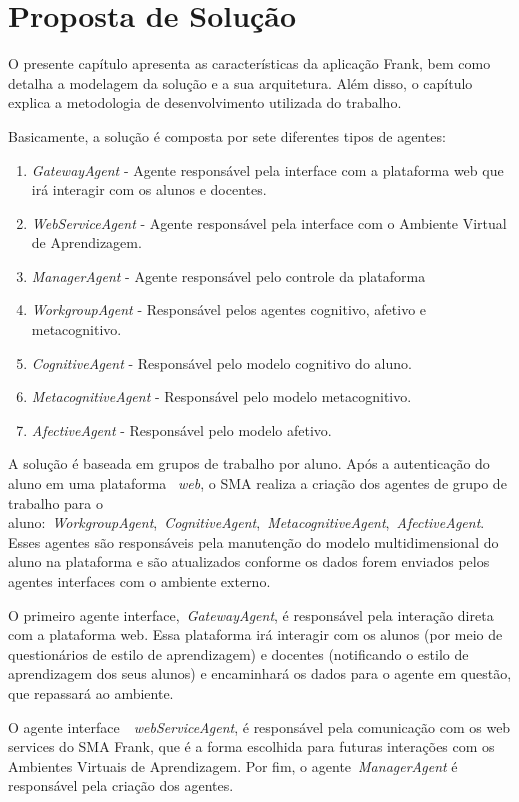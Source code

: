 \chapter{Proposta de Solução}

O presente capítulo apresenta as características da aplicação Frank, bem como detalha a modelagem da solução e a sua arquitetura. Além disso, o capítulo explica a metodologia de desenvolvimento utilizada do trabalho.

Basicamente, a solução é composta por sete diferentes tipos de agentes:
\begin{enumerate}
	\item \emph{GatewayAgent} - Agente responsável pela interface com a plataforma web que irá interagir com os alunos e docentes.
	\item \emph{WebServiceAgent} - Agente responsável pela interface com o Ambiente Virtual de Aprendizagem.
	\item \emph{ManagerAgent} - Agente responsável pelo controle da plataforma
	\item \emph{WorkgroupAgent} - Responsável pelos agentes cognitivo, afetivo e metacognitivo.
	\item \emph{CognitiveAgent} - Responsável pelo modelo cognitivo do aluno.
	\item \emph{MetacognitiveAgent} - Responsável pelo modelo metacognitivo.
	\item \emph{AfectiveAgent} - Responsável pelo modelo afetivo.
\end{enumerate}

A solução é baseada em grupos de trabalho por aluno. Após a autenticação do aluno em uma plataforma ~\emph{web}, o SMA realiza a criação dos agentes de grupo de trabalho para o aluno:~\emph{WorkgroupAgent},~\emph{CognitiveAgent},~\emph{MetacognitiveAgent},~\emph{AfectiveAgent}. Esses agentes são responsáveis pela manutenção do modelo multidimensional do aluno na plataforma e são atualizados conforme os dados forem enviados pelos agentes interfaces com o ambiente externo.

O primeiro agente interface,~\emph{GatewayAgent}, é responsável pela interação direta com a plataforma web. Essa plataforma irá interagir com os alunos (por meio de questionários de estilo de aprendizagem) e docentes (notificando o estilo de aprendizagem dos seus alunos) e encaminhará os dados para o agente em questão, que repassará ao ambiente.

O agente interface~\emph{~\emph{web}ServiceAgent}, é responsável pela comunicação com os web services do SMA Frank, que é a forma escolhida para futuras interações com os Ambientes Virtuais de Aprendizagem. Por fim, o agente~\emph{ManagerAgent} é responsável pela criação dos agentes.

